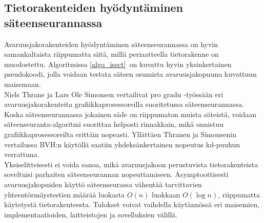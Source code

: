 \documentclass[a4paper, 12pt, titlepage]{article}
\begin{document}


\subsection{Tietorakenteiden hyödyntäminen säteenseurannassa}

Avaruusjakorakenteiden hyödyntäminen säteenseurannassa on hyvin samankaltaista riippumatta siitä, millä periaatteella tietorakenne on muodostettu. Algoritmissa \ref{algo_isect} on kuvattu hyvin yksinkertainen pseudokoodi, jolla voidaan testata säteen osumista avaruusjakopuuna kuvattuun maisemaan.\\ 




Niels Thrane ja Lars Ole Simonsen vertailivat pro gradu -työssään eri avaruusjakorakenteita grafiikkaprosessoreilla suoritetussa säteenseurannassa. Koska säteenseurannassa jokainen säde on riippumaton muista säteistä, voidaan säteenseuranta-algoritmi suorittaa helposti rinnakkain, mikä onnistuu grafiikkaprosessoreilta erittäin nopeasti. Yllättäen Thranen ja Simonsenin vertailussa BVH:n käytöllä saatiin yhdeksänkertainen nopeutus kd-puuhun verrattuna. \citep[.]{thrane}\\  

Yksiselitteisesti ei voida sanoa, mikä avaruusjakoon perustuvista tietorakenteista soveltuisi parhaiten säteenseurannan nopeuttamiseen. Asymptoottisesti avaruusjakopuiden käyttö säteenseurassa vähentää tarvittavien yhteentörmäystestien määrää luokasta $O(n)$ luokkaan $O(\log n)$, riippumatta käytetystä tietorakenteesta. Tulokset voivat vaihdella käytännössä eri maisemien, implementaatioiden, laitteistojen ja sovelluksien välillä. \citep[.]{wald04}  



\end{document}
